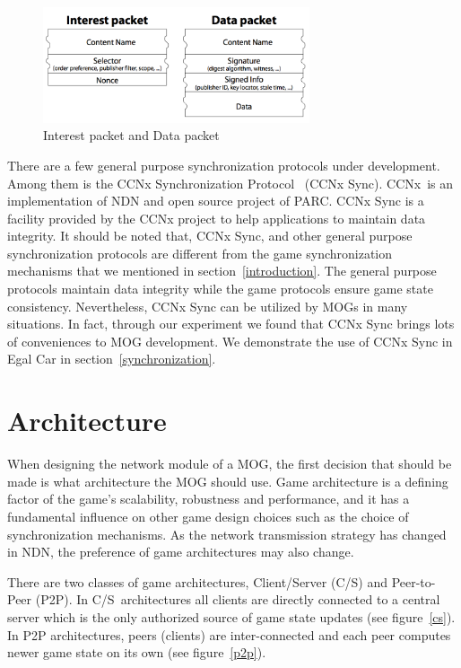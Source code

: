 \documentclass{article}
\newcommand{\cs}{C\slash S}
\begin{document}
\begin{figure}
\begin{center}
\includegraphics[width=0.7\textwidth] {image/packet_types}
\caption{Interest packet and Data packet}
\label{img:packet_types}
\end{center}
\end{figure}

There are a few general purpose synchronization protocols under development. Among them is the CCNx Synchronization Protocol~\cite{CCNxSync} (CCNx Sync). CCNx\textregistered~is an implementation of NDN and open source project of PARC\textregistered. CCNx Sync is a facility provided by the CCNx project to help applications to maintain data integrity. It should be noted that, CCNx Sync, and other general purpose synchronization protocols are different from the game synchronization mechanisms that we mentioned in section~\ref{introduction}. The general purpose protocols maintain data integrity while the game protocols ensure game state consistency. Nevertheless, CCNx Sync can be utilized by MOGs in many situations. In fact, through our experiment we found that CCNx Sync brings lots of conveniences to MOG development. We demonstrate the use of CCNx Sync in Egal Car in section~\ref{synchronization}.


\section{Architecture}
\label{architecture}

When designing the network module of a MOG, the first decision that should be made is what architecture the MOG should use. Game architecture is a defining factor of the game's scalability, robustness and performance, and it has a fundamental influence on other game design choices such as the choice of synchronization mechanisms. As the network transmission strategy has changed in NDN, the preference of game architectures may also change.

There are two classes of game architectures, Client\slash Server (\cs) and Peer-to-Peer (P2P). In \cs~architectures all clients are directly connected to a central server which is the only authorized source of game state updates (see figure~\ref{cs}). In P2P architectures, peers (clients) are inter-connected and each peer computes newer game state on its own (see figure~\ref{p2p}). 
\end{document}
